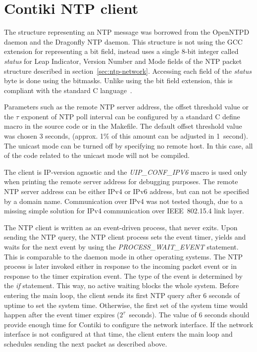 \newpage
\section{Contiki NTP client}
The structure representing an NTP message was borrowed from the OpenNTPD daemon
and the Dragonfly NTP daemon.
This structure is not using the GCC extension for representing a bit field,
instead uses a single 8-bit integer called {\it{status}}
for Leap Indicator, Version Number and Mode fields of the NTP packet
structure described in section~\ref{sec:ntp-network}.
Accessing each field of the {\it{status}} byte is done using the bitmasks.
Unlike using the bit field extension,
this is compliant with the standard C language~\cite{c99}.

Parameters such as the remote NTP server address, the offset threshold value
or the $\tau$ exponent of NTP poll interval can be configured by a standard C define macro
in the source code or in the Makefile.
The default offset threshold value was chosen 3 seconds,
(approx. 1\% of this amount can be adjusted in 1~second).
The unicast mode can be turned off by specifying no remote host.
In this case, all of the code related to the unicast mode will not be compiled.

The client is IP-version agnostic and the {\it{UIP\_CONF\_IPV6}} macro is used only
when printing the remote server address for debugging purposes.
The remote NTP server address can be either IPv4 or IPv6 address,
but can not be specified by a domain name.
Communication over IPv4 was not tested though, due to a missing simple solution for
IPv4 communication over IEEE~802.15.4 link layer. %

The NTP client is written as an event-driven process, that never exits.
Upon sending the NTP query, the NTP client process sets the event timer,
yields and waits for the next event by using the {\it{PROCESS\_WAIT\_EVENT}} statement.
This is comparable to the daemon mode in other operating systems.
The NTP process is later invoked either in response to the incoming packet event
or in response to the timer expiration event.
The type of the event is determined by the {\it{if}} statement.
This way, no active waiting blocks the whole system.
Before entering the main loop, the client sends
its first NTP query after 6 seconds of uptime to set the system time.
Otherwise, the first set of the system time would happen
after the event timer expires ($2^{\tau}$~seconds).
The value of 6 seconds should provide enough time for Contiki to
configure the network interface.
If the network interface is not configured at that time,
the client enters the main loop and schedules sending the next packet as described above.

